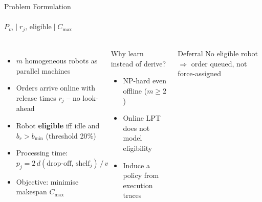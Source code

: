 \documentclass[aspectratio=169]{beamer}
\begin{document}
\begin{frame}{Problem Formulation}
  \framesubtitle{$P_m \mid r_j,\, \mathrm{eligible} \mid C_{\max}$}
  \begin{columns}[onlytextwidth]
      \begin{itemize}
        \item $m$ homogeneous robots as parallel machines
        \item Orders arrive online with release times $r_j$ -- no look-ahead
        \item Robot \textbf{eligible} iff idle and $b_r > b_{\min}$ (threshold 20\%)
        \item Processing time: $p_j = 2\,d(\text{drop-off},\, \text{shelf}_j)\,/\,v$
        \item Objective: minimise makespan $C_{\max}$
      \end{itemize}
      \begin{block}{Why learn instead of derive?}
        \begin{itemize}
          \item NP-hard even offline ($m \geq 2$)
          \item Online LPT does not model eligibility
          \item \alert{Induce a policy from execution traces}
        \end{itemize}
      \end{block}
      \begin{alertblock}{Deferral}
        No eligible robot $\Rightarrow$ order queued, not force-assigned
      \end{alertblock}
  \end{columns}
\end{frame}
\end{document}
